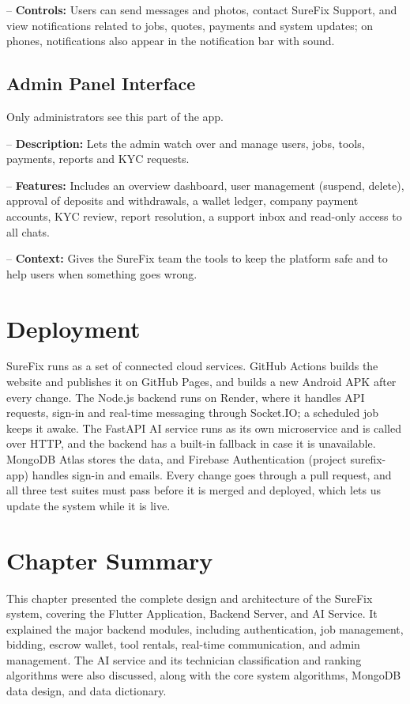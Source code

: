 \documentclass[A4paper,12pt]{report}
\theoremstyle{plain}
\theoremstyle{definition}
\theoremstyle{remark}
\numberwithin{equation}{section}
\begin{document}
-- \textbf{Controls:} Users can send messages and photos, contact SureFix Support, and view notifications related to jobs, quotes, payments and system updates; on phones, notifications also appear in the notification bar with sound.

\subsection{Admin Panel Interface}

Only administrators see this part of the app.

-- \textbf{Description:} Lets the admin watch over and manage users, jobs, tools, payments, reports and KYC requests.

-- \textbf{Features:} Includes an overview dashboard, user management (suspend, delete), approval of deposits and withdrawals, a wallet ledger, company payment accounts, KYC review, report resolution, a support inbox and read-only access to all chats.

-- \textbf{Context:} Gives the SureFix team the tools to keep the platform safe and to help users when something goes wrong.
\section{Deployment}
SureFix runs as a set of connected cloud services. GitHub Actions builds the website and publishes it on GitHub Pages, and builds a new Android APK after every change. The Node.js backend runs on Render, where it handles API requests, sign-in and real-time messaging through Socket.IO; a scheduled job keeps it awake. The FastAPI AI service runs as its own microservice and is called over HTTP, and the backend has a built-in fallback in case it is unavailable. MongoDB Atlas stores the data, and Firebase Authentication (project surefix-app) handles sign-in and emails. Every change goes through a pull request, and all three test suites must pass before it is merged and deployed, which lets us update the system while it is live.



\section{Chapter Summary}
This chapter presented the complete design and architecture of the SureFix system, covering the Flutter Application, Backend Server, and AI Service. It explained the major backend modules, including authentication, job management, bidding, escrow wallet, tool rentals, real-time communication, and admin management. The AI service and its technician classification and ranking algorithms were also discussed, along with the core system algorithms, MongoDB data design, and data dictionary.
\end{document}

